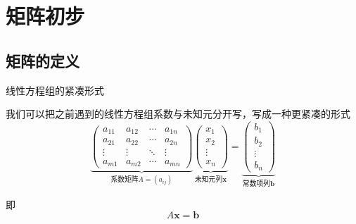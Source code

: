 
\section{矩阵初步}


\subsection{矩阵的定义}


\begin{frame}{线性方程组的紧凑形式}

我们可以把之前遇到的线性方程组系数与未知元分开写，写成一种更紧凑的形式
\[
\underbrace{\begin{pmatrix}
a_{11} & a_{12} & \cdots & a_{1n} \\
a_{21} & a_{22} & \cdots & a_{2n} \\
\vdots & \vdots & \ddots & \vdots \\
a_{m1} & a_{m2} & \cdots & a_{mn}
\end{pmatrix}}_{\text{系数矩阵} A = (a_{ij})} \underbrace{\begin{pmatrix}
x_1 \\ x_2 \\ \vdots \\ x_n
\end{pmatrix}}_{\text{未知元列}\mathbf{x}} =
\underbrace{\begin{pmatrix}
b_1 \\ b_2 \\ \vdots \\ b_n
\end{pmatrix}}_{\text{常数项列}\mathbf{b}}
\]

\pause

即
\[A\mathbf{x} = \mathbf{b}\]

\end{frame}


